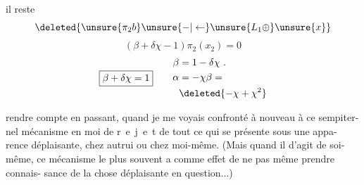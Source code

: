 il reste 
\[
\deleted{\unsure{\pi_2 b}\unsure{-|\leftarrow}\unsure{L_1\oplus}\unsure{x}}
\]
\[
(\beta+\delta\chi-1)\pi_2(x_2)=0
\]
\[
\boxed{\beta+\delta\chi=1}\qquad
\begin{aligned}
\beta&=1-\delta\chi\ .\\
\alpha&=-\chi\beta=\\
&\deleted{-\chi+\chi^2}
\end{aligned}
\]

rendre compte en passant, quand je me voyais confronté à nouveau à ce sempiter-\linebreak
nel mécanisme en moi de \mbox{r e j e t} de tout ce qui se présente sous une appa-\linebreak
rence déplaisante, chez autrui ou chez moi-même. (Mais quand il d'agit de soi-\linebreak
même, ce mécanisme le plus souvent a comme effet de ne pas même prendre connais-\linebreak
sance de la chose déplaisante en question...)

